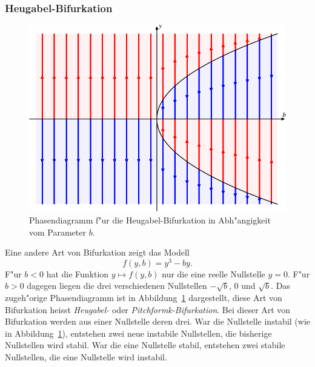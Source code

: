 \subsubsection{Heugabel-Bifurkation}
\begin{figure}
\centering
\includegraphics{chapters/images/bifurkation-2.pdf}
\caption{Phasendiagramm f"ur die Heugabel-Bifurkation in Abh"angigkeit vom
Parameter $b$.
\label{geometrie:pitchfork}}
\end{figure}
Eine andere Art von Bifurkation zeigt das Modell
\[
f(y,b)=y^3-by.
\]
F"ur $b<0$ hat die Funktion $y\mapsto f(y,b)$ nur die eine
reelle Nullstelle $y=0$.
F"ur $b>0$ dagegen liegen die drei verschiedenen Nullstellen
$-\sqrt{b}$, $0$  und $\sqrt{b}$.
Das zugeh"orige Phasendiagramm ist in Abbildung~\ref{geometrie:pitchfork}
dargestellt, diese Art von Bifurkation heisst {\em Heugabel-}
oder {\em Pitchformk-Bifurkation}.
Bei dieser Art von Bifurkation werden aus einer Nullstelle deren drei.
War die Nullstelle instabil (wie in Abbildung~\ref{geometrie:pitchfork}),
entstehen zwei neue instabile Nullstellen, die bisherige Nullstellen 
wird stabil.
War die eine Nullstelle stabil, entstehen zwei stabile Nullstellen, die
eine Nullstelle wird instabil.

